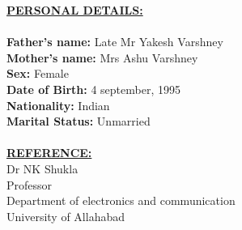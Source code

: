 \documentclass{article}
\begin{document}
				\underline{\textbf{PERSONAL DETAILS:}}\\
				\\
				\textbf{Father's name:} Late Mr Yakesh Varshney\\
				\textbf{Mother's name:} Mrs Ashu Varshney\\
				\textbf{Sex:} Female\\
				\textbf{Date of Birth:} 4 september, 1995\\
				\textbf{Nationality:} Indian\\
				\textbf{Marital Status:} Unmarried\\
				\\
					\underline{\textbf{REFERENCE:}}
					\\[\baselineskip]
					Dr NK Shukla\\
					Professor\\
					Department of electronics and communication\\
					University of Allahabad\\			
			
\end{document}
